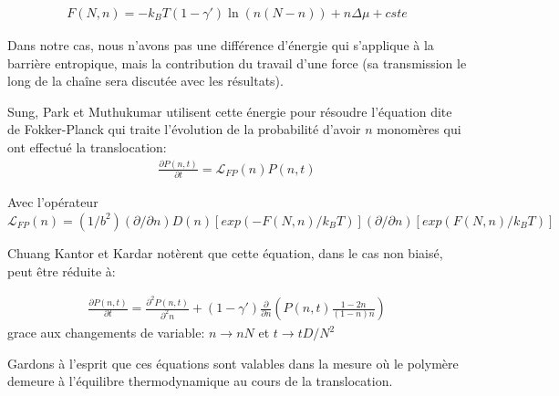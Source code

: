 \begin{eqnarray}
F(N,n)= -k_BT(1-\gamma')\ln \left(n(N-n)\right) + n \Delta \mu +cste
\label{energbargen}
\end{eqnarray}

Dans notre cas, nous n'avons pas une différence d'énergie qui s'applique à la barrière entropique, mais la contribution du travail d'une force (sa transmission le long de la chaîne sera discutée avec les résultats).

Sung, Park et Muthukumar \cite{Sung1996,Muthukumar1999} utilisent cette énergie pour résoudre l'équation dite de Fokker-Planck qui traite l'évolution de la probabilité d'avoir $n$ monomères qui ont effectué la translocation:
\begin{eqnarray}
\frac{\partial P(n,t)}{\partial t} =   \mathcal{L}_{FP}(n) P(n,t)
\label{equfokkerplank1}
\end{eqnarray}

Avec l'opérateur $\mathcal{L}_{FP}(n)= (1/b^2)(\partial/\partial n) D(n)[exp(-F(N,n)/k_BT)](\partial/\partial n)[exp(F(N,n)/k_BT)]$

Chuang Kantor et Kardar \cite{Chuang2001} notèrent que cette équation, dans le cas non biaisé, peut être réduite à:

\begin{eqnarray}
\frac{\partial P(n,t)}{\partial t} =   \frac{\partial ^2 P(n,t)}{\partial ^2 n} +(1-\gamma') \frac{\partial  }{\partial  n}\left(P(n,t)\frac{1-2n}{(1-n)n}\right)
\label{equfokkerplank2}
\end{eqnarray}
grace aux changements de variable:
$n \rightarrow nN$ et $t \rightarrow tD/N^2$


Gardons à l'esprit que ces équations sont valables dans la mesure où le polymère demeure à l'équilibre thermodynamique au cours de la translocation.



